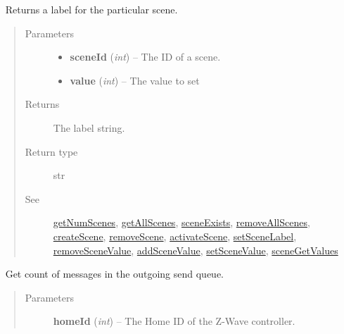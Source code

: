 \documentclass[letterpaper,10pt,english]{sphinxmanual}
\begin{document}
\begin{fulllineitems}
\begin{fulllineitems}
\end{fulllineitems}


\begin{fulllineitems}
\label{libopenzwave:libopenzwave.PyManager.getSceneLabel}~\label{libopenzwave:getscenelabel}
Returns a label for the particular scene.
\begin{quote}\begin{description}
\item[{Parameters}] \leavevmode\begin{itemize}
\item {} 
\textbf{sceneId} (\emph{int}) -- The ID of a scene.

\item {} 
\textbf{value} (\emph{int}) -- The value to set

\end{itemize}

\item[{Returns}] \leavevmode
The label string.

\item[{Return type}] \leavevmode
str

\item[{See}] \leavevmode
{\hyperref[libopenzwave:getnumscenes]{getNumScenes}}, {\hyperref[libopenzwave:getallscenes]{getAllScenes}}, {\hyperref[libopenzwave:sceneexists]{sceneExists}}, {\hyperref[libopenzwave:removeallscenes]{removeAllScenes}}, {\hyperref[libopenzwave:createscene]{createScene}}, {\hyperref[libopenzwave:removescene]{removeScene}}, {\hyperref[libopenzwave:activatescene]{activateScene}}, {\hyperref[libopenzwave:setscenelabel]{setSceneLabel}}, {\hyperref[libopenzwave:removescenevalue]{removeSceneValue}}, {\hyperref[libopenzwave:addscenevalue]{addSceneValue}}, {\hyperref[libopenzwave:setscenevalue]{setSceneValue}}, {\hyperref[libopenzwave:scenegetvalues]{sceneGetValues}}

\end{description}\end{quote}

\end{fulllineitems}


\begin{fulllineitems}
\label{libopenzwave:libopenzwave.PyManager.getSendQueueCount}~\label{libopenzwave:getsendqueuecount}
Get count of messages in the outgoing send queue.
\begin{quote}\begin{description}
\item[{Parameters}] \leavevmode
\textbf{homeId} (\emph{int}) -- The Home ID of the Z-Wave controller.


\end{description}
\end{quote}
\end{fulllineitems}
\end{fulllineitems}
\end{document}
